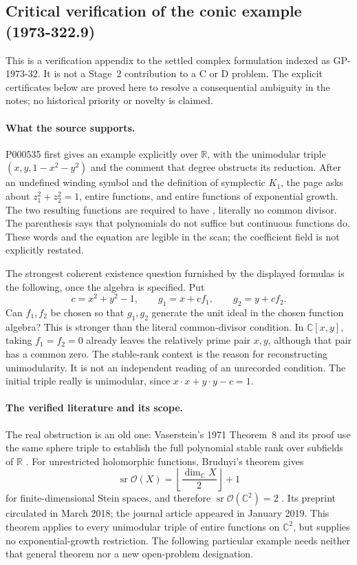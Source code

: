 \subsection{Critical verification of the conic example (1973-322.9)}
\label{sec:conic-verification-1973}

This is a verification appendix to the settled complex formulation indexed as
GP-1973-32. It is not a Stage~2 contribution to a C or D problem. The explicit
certificates below are proved here to resolve a consequential ambiguity in the
notes; no historical priority or novelty is claimed.

\paragraph{What the source supports.}
P000535 first gives an example explicitly over \(\mathbb R\), with the
unimodular triple \((x,y,1-x^2-y^2)\) and the comment that degree obstructs its
reduction. After an undefined winding symbol and the definition of symplectic
\(K_1\), the page asks about \(z_1^2+z_2^2=1\), entire functions, and entire
functions of exponential growth. The two resulting functions are required to
have , literally no common divisor. The parenthesis
 says that polynomials do not suffice
but continuous functions do. These words and the equation are legible in the
scan; the coefficient field is not explicitly restated.

The strongest coherent existence question furnished by the displayed formulas
is the following, once the algebra is specified. Put
\[
 c=x^2+y^2-1,
 \qquad g_1=x+cf_1,\qquad g_2=y+cf_2.
\]
Can \(f_1,f_2\) be chosen so that \(g_1,g_2\) generate the unit ideal in the
chosen function algebra? This is stronger than the literal common-divisor
condition. In \(\mathbb C[x,y]\), taking \(f_1=f_2=0\) already leaves the
relatively prime pair \(x,y\), although that pair has a common zero. The
stable-rank context is the reason for reconstructing unimodularity. It is not
an independent reading of an unrecorded condition. The initial triple really
is unimodular, since \(x\cdot x+y\cdot y-c=1\).

\paragraph{The verified literature and its scope.}
The real obstruction is an old one: Vaserstein's 1971 Theorem~8 and its proof
use the same sphere triple to establish the full polynomial stable rank over
subfields of \(\mathbb R\) \citep[Russian p.~27]{vaserstein1971stable}.
For unrestricted holomorphic functions, Brudnyi's theorem gives
\[
 \operatorname{sr}\mathcal O(X)
   =\left\lfloor\frac{\dim_{\mathbb C}X}{2}\right\rfloor+1
\]
for finite-dimensional Stein spaces, and therefore
\(\operatorname{sr}\mathcal O(\mathbb C^2)=2\)
\citep[Theorem~1.1]{brudnyi2019stein}. Its preprint circulated in March 2018;
the journal article appeared in January 2019. This theorem applies to every
unimodular triple of entire functions on \(\mathbb C^2\), but supplies no
exponential-growth restriction. The following particular example needs neither
that general theorem nor a new open-problem designation.


